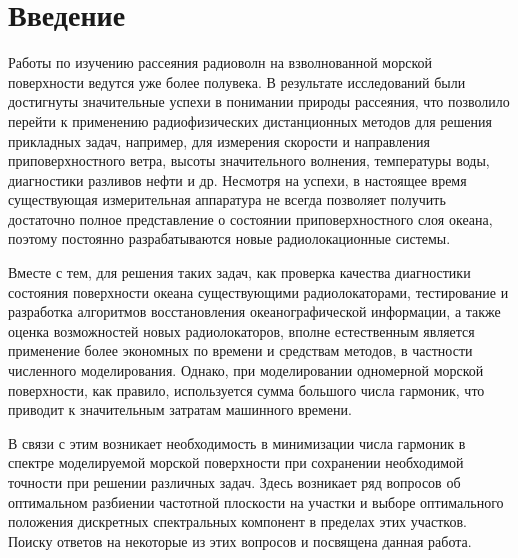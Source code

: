 


\def\labauthors{Понур К.А.}
\def\labtheme{Численное моделирование морской поверхности}
\newcommand{\tM}{\widetilde{M}}
\renewcommand{\phi}{\varphi}
\renewcommand{\hat}{\widehat}
\renewcommand{\vec}{\vv}



\section*{Введение}

Работы по изучению рассеяния радиоволн на взволнованной морской поверхности ведутся уже более полувека. В результате исследований были достигнуты значительные успехи в понимании природы рассеяния, что позволило перейти к применению радиофизических дистанционных методов для решения прикладных задач, например, для измерения скорости и направления приповерхностного ветра, высоты значительного волнения, температуры воды, диагностики разливов нефти и др.  
Несмотря на успехи, в настоящее время существующая измерительная аппаратура не всегда позволяет получить достаточно полное представление о состоянии приповерхностного  слоя океана, поэтому постоянно разрабатываются новые радиолокационные системы. 

Вместе с тем, для решения таких задач, как проверка качества диагностики состояния поверхности океана существующими радиолокаторами, тестирование и разработка алгоритмов восстановления океанографической информации, а также оценка возможностей новых радиолокаторов, вполне естественным является применение более экономных по времени и средствам методов, в частности численного моделирования.  Однако, при моделировании одномерной морской поверхности, как правило, используется сумма большого числа гармоник, что приводит к значительным затратам машинного времени.

В связи с этим возникает необходимость в минимизации числа гармоник в спектре моделируемой морской поверхности при сохранении необходимой точности при решении различных задач. Здесь возникает ряд вопросов об оптимальном разбиении частотной плоскости на участки и выборе оптимального положения дискретных спектральных компонент в пределах этих участков. Поиску ответов на некоторые из этих вопросов и посвящена данная работа.


